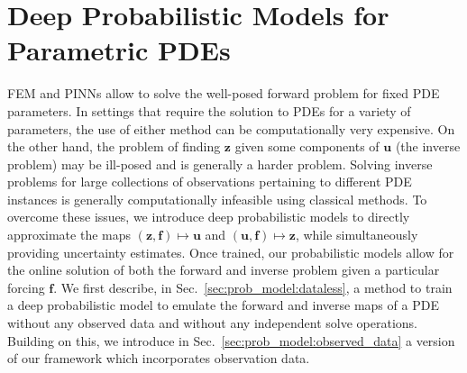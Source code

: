 \documentclass[11pt, fleqn]{article}
\def\z{{\mathbf z}}
\def\fbf{{\mathbf f}}
\def\ubf{{\mathbf u}}
\def\cG{{\mathcal G}}
\begin{document}
\section{Deep Probabilistic Models for Parametric PDEs}
%
FEM and PINNs allow to solve the well-posed forward problem for fixed PDE parameters. In settings that require the solution to PDEs for a variety of parameters, the use of either method can be computationally very expensive. On the other hand, the problem of finding $\z$ given some components of $\ubf$ (the inverse problem) may be ill-posed and is generally a harder problem. Solving inverse problems for large collections of observations pertaining to different PDE instances is generally computationally infeasible using classical methods. To overcome these issues, we introduce deep probabilistic  models to directly approximate the maps $(\z, \fbf) \mapsto \ubf$ and $(\ubf, \fbf) \mapsto \z$, while simultaneously providing uncertainty estimates. Once trained, our probabilistic models allow for the online solution of both the forward and inverse problem given a particular forcing $\fbf$. We first describe, in Sec.~\ref{sec:prob_model:dataless}, a method to train a deep probabilistic model to emulate the forward and inverse maps of a PDE without any observed data and without any independent solve operations. 
Building on this, we introduce in Sec.~\ref{sec:prob_model:observed_data} a version of our framework which incorporates observation data.

\end{document}
